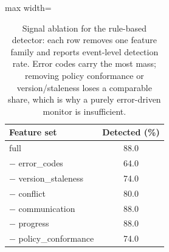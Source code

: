 \begin{table}[t]
\centering\small
\caption{Signal ablation for the rule-based detector: each row removes one
feature family and reports event-level detection rate. Error codes carry the most
mass; removing policy conformance or version/staleness loses a comparable share,
which is why a purely error-driven monitor is insufficient.}
\label{tab:ablation}
\begin{adjustbox}{max width=\textwidth}
\begin{tabular}{@{}lc@{}}
\toprule
Feature set & Detected (\%) \\
\midrule
full & 88.0 \\
$-$ error\_codes & 64.0 \\
$-$ version\_staleness & 74.0 \\
$-$ conflict & 80.0 \\
$-$ communication & 88.0 \\
$-$ progress & 88.0 \\
$-$ policy\_conformance & 74.0 \\
\bottomrule
\end{tabular}
\end{adjustbox}
\end{table}
